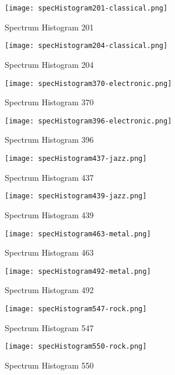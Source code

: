 \documentclass{article} %
\begin{document}
\begin{figure}[H]
\centering
\texttt{[image: specHistogram201-classical.png]}
\caption{Spectrum Histogram 201}
\label{fig:hist201}
\end{figure}

\begin{figure}[H]
\centering
\texttt{[image: specHistogram204-classical.png]}
\caption{Spectrum Histogram 204}
\label{fig:hist204}
\end{figure}


\begin{figure}[H]
\centering
\texttt{[image: specHistogram370-electronic.png]}
\caption{Spectrum Histogram 370}
\label{fig:hist370}
\end{figure}

\begin{figure}[H]
\centering
\texttt{[image: specHistogram396-electronic.png]}
\caption{Spectrum Histogram 396}
\label{fig:hist396}
\end{figure}

\begin{figure}[H]
\centering
\texttt{[image: specHistogram437-jazz.png]}
\caption{Spectrum Histogram 437}
\label{fig:hist437}
\end{figure}

\begin{figure}[H]
\centering
\texttt{[image: specHistogram439-jazz.png]}
\caption{Spectrum Histogram 439}
\label{fig:hist439}
\end{figure}

\begin{figure}[H]
\centering
\texttt{[image: specHistogram463-metal.png]}
\caption{Spectrum Histogram 463}
\label{fig:hist463}
\end{figure}

\begin{figure}[H]
\centering
\texttt{[image: specHistogram492-metal.png]}
\caption{Spectrum Histogram 492}
\label{fig:hist492}
\end{figure}

\begin{figure}[H]
\centering
\texttt{[image: specHistogram547-rock.png]}
\caption{Spectrum Histogram 547}
\label{fig:hist547}
\end{figure}

\begin{figure}[H]
\centering
\texttt{[image: specHistogram550-rock.png]}
\caption{Spectrum Histogram 550}
\label{fig:hist550}
\end{figure}
\end{document}
